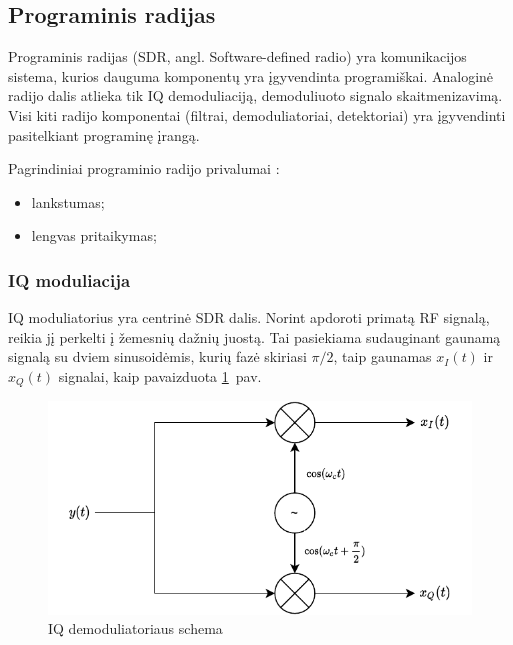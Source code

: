 \documentclass[main.tex]{subfiles}
\begin{document}
\subsection{Programinis radijas}

Programinis radijas (SDR, angl. Software-defined radio) yra komunikacijos sistema,
kurios dauguma komponentų yra įgyvendinta programiškai. Analoginė radijo dalis
atlieka tik IQ demoduliaciją, demoduliuoto signalo skaitmenizavimą.
Visi kiti radijo komponentai (filtrai, demoduliatoriai, detektoriai) yra įgyvendinti
pasitelkiant programinę įrangą.

Pagrindiniai programinio radijo privalumai \cite{Sadiku-2004}:
\begin{itemize}
    \item lankstumas;
    \item lengvas pritaikymas;
\end{itemize}

\subsubsection{IQ moduliacija}

IQ moduliatorius yra centrinė SDR dalis. Norint apdoroti primatą RF signalą, reikia
jį perkelti į žemesnių dažnių juostą. Tai pasiekiama sudauginant gaunamą signalą su dviem
sinusoidėmis, kurių fazė skiriasi $\pi/2$, taip gaunamas $x_I(t)$ ir $x_Q(t)$ signalai,
kaip pavaizduota \ref{fig:iq_modulator}~pav.

\begin{figure}[h]
    \begin{centering}
    \includegraphics[scale=1.0]{drawings/iq_modulator}
    \par\end{centering}
    \protect\caption{\label{fig:iq_modulator}IQ demoduliatoriaus schema}
\end{figure}
\end{document}
